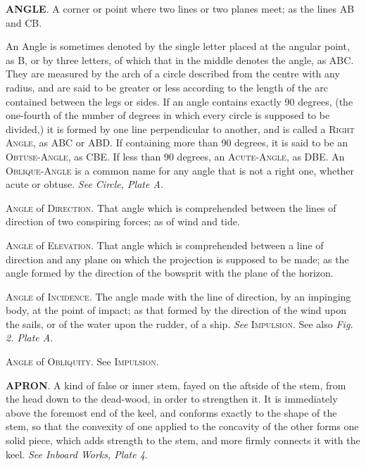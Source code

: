 \textbf{ANGLE}. A corner or point where two lines or two planes meet; as the lines AB and CB.
\begin{figure}
\begin{center}
\end{center}
\end{figure}
An Angle is sometimes denoted by the single letter placed at the angular point, as B, or by three letters, of which that in the middle denotes the angle, as ABC. They are measured by the arch of a circle described from the centre with any radius, and are said to be greater or less according to the length of the arc contained between the legs or sides. If an angle contains exactly 90 degrees, (the one-fourth of the number of degrees in which every circle is supposed to be divided,) it is formed by one line perpendicular to another, and is called a \textsc{Right Angle}, as ABC or ABD. If containing more than 90 degrees, it is said to be an \textsc{Obtuse-Angle}, as CBE. If less than 90 degrees, an \textsc{Acute-Angle}, as DBE. An \textsc{Oblique-Angle} is a common name for any angle that is not a right one, whether acute or obtuse. \textit{See Circle, Plate A. }

\textsc{Angle} of \textsc{Direction}. That angle which is comprehended between the lines of direction of two conspiring forces; as of wind and tide. 

\textsc{Angle} of \textsc{Elevation}. That angle which is comprehended between a line of direction and any plane on which the projection is supposed to be made; as the angle formed by the direction of the bowsprit with the plane of the horizon. 

\textsc{Angle} of \textsc{Incidence}. The angle made with the line of direction, by an impinging body, at the point of impact; as that formed by the direction of the wind upon the sails, or of the water upon the rudder, of a ship. \textit{See} \textsc{Impulsion}. See also \textit{Fig. 2. Plate A}. 

\textsc{Angle} of \textsc{Obliquity}. See \textsc{Impulsion}. 

\textbf{APRON}. A kind of false or inner stem, fayed on the aftside of the stem, from the head down to the dead-wood, in order to strengthen it. It is immediately above the foremost end of the keel, and conforms exactly to the shape of the stem, so that the convexity of one applied to the concavity of the other forms one solid piece, which adds strength to the stem, and more firmly connects it with the keel. \textit{See Inboard Works, Plate 4}. 

